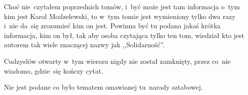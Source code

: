 \documentclass[a4paper,11pt]{article}
\begin{document}
\vspace{\spaceFour}


\start {} Choć nie~czytałem poprzednich tomów, i~być może jest
tam informacja o~tym kim jest Karol Modzelewski, to w~tym tomie jest
wymieniony tylko dwa razy i~nie da~się zrozumieć kim on jest. Powinna
być tu podana jakaś krótka informacja, kim on był, tak aby osoba
czytająca tylko ten tom, wiedział kto jest autorem tak wiele znaczącej
nazwy jak ,,Solidarność''.

\vspace{\spaceFour}


\start {} Cudzysłów otwarty w~tym wierszu nigdy nie został
zamknięty, przez co~nie wiadomo, gdzie~się kończy cytat.

\vspace{\spaceFour}


\start {} Nie jest podane co było tematem omawianej
tu~narady sztabowej.



\vspace{\spaceTwo}








\end{document}
